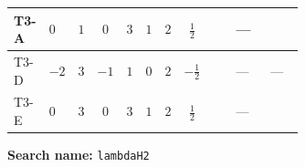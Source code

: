 \documentclass[8pt]{article}
\begin{document}
\begin{landscape}
\begin{longtable}{@{}llcccccc >{\raggedright\arraybackslash}p{0.21\linewidth} >{\raggedright\arraybackslash}p{0.21\linewidth} >{\raggedright\arraybackslash}p{0.21\linewidth}@{}}
\midrule
T3-A & $0$ & $1$ & $0$ & $3$ & $1$ & $2$ & $\frac{1}{2}$ & \scriptsize\adjustbox{max width=\linewidth}{$\begin{gathered} +8 {\lambda_{H2}} {\lambda_{S_2}}\end{gathered}$} & --- & \scriptsize\adjustbox{max width=\linewidth}{$\begin{gathered} {\lambda_{H2}} (6 \operatorname{Tr}\!\left({Y_d}\,\left({Y_d}\right)^{\dagger}\right)+2 \operatorname{Tr}\!\left({Y_e}\,\left({Y_e}\right)^{\dagger}\right)+6 \operatorname{Tr}\!\left({Y_u}\,\left({Y_u}\right)^{\dagger}\right)+4 {\lambda_{S_2}^{\rm Adj}})\end{gathered}$} \\
\midrule
T3-D & $-2$ & $3$ & $-1$ & $1$ & $0$ & $2$ & $-\frac{1}{2}$ & \scriptsize\adjustbox{max width=\linewidth}{$\begin{gathered} +4 {\lambda_{H2}} {\lambda_{S_2}}\end{gathered}$} & --- & --- \\
\midrule
T3-E & $0$ & $3$ & $0$ & $3$ & $1$ & $2$ & $\frac{1}{2}$ & \scriptsize\adjustbox{max width=\linewidth}{$\begin{gathered} +8 {\lambda_{H2}} {\lambda_{S_2}}\end{gathered}$} & --- & \scriptsize\adjustbox{max width=\linewidth}{$\begin{gathered} {\lambda_{H2}} (6 \operatorname{Tr}\!\left({Y_d}\,\left({Y_d}\right)^{\dagger}\right)+2 \operatorname{Tr}\!\left({Y_e}\,\left({Y_e}\right)^{\dagger}\right)+6 \operatorname{Tr}\!\left({Y_u}\,\left({Y_u}\right)^{\dagger}\right)+4 {\lambda_{S_2}^{\rm Adj}})\end{gathered}$} \\
\midrule
\bottomrule
\end{longtable}
\clearpage
\noindent\textbf{Search name: }\texttt{lambdaH2}\par\smallskip

\end{landscape}
\end{document}
